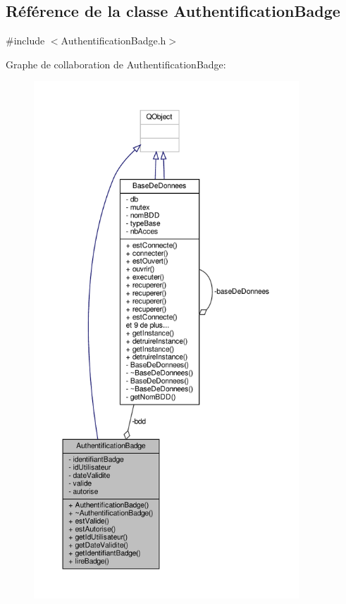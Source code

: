 \hypertarget{class_authentification_badge}{}\subsection{Référence de la classe Authentification\+Badge}
\label{class_authentification_badge}


{\ttfamily \#include $<$Authentification\+Badge.\+h$>$}



Graphe de collaboration de Authentification\+Badge\+:\nopagebreak
\begin{figure}[H]
\begin{center}
\leavevmode
\includegraphics[height=550pt]{class_authentification_badge__coll__graph}
\end{center}
\end{figure}
